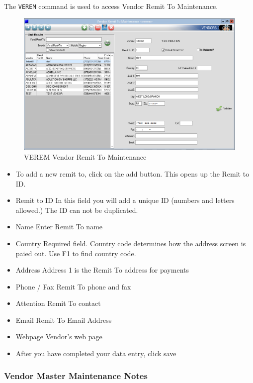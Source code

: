
The \texttt{VEREM} command is used to access Vendor Remit To Maintenance.

\begin{figure}[H]
	\includegraphics[width=\textwidth]{../img/image72}
	\caption{VEREM Vendor Remit To Maintenance}
\end{figure}

\begin{itemize}
	\item To add a new remit to, click on the add button. This opens up the Remit to ID.
	\item Remit to ID \textemdash In this field you will add a unique ID (numbers and letters allowed.) The ID can not be duplicated.
	\item Name \textemdash Enter Remit To name
	\item Country \textemdash Required field. Country code determines how the address screen is paied out. Use F1 to find country code.
	\item Address \textemdash Address 1 is the Remit To address for payments
	\item Phone / Fax \textemdash Remit To phone and fax
	\item Attention \textemdash Remit To contact
	\item Email \textemdash Remit To Email Address
	\item Webpage \textemdash Vendor's web page
	\item After you have completed your data entry, click save
\end{itemize}

\subsubsection{Vendor Master Maintenance Notes}

